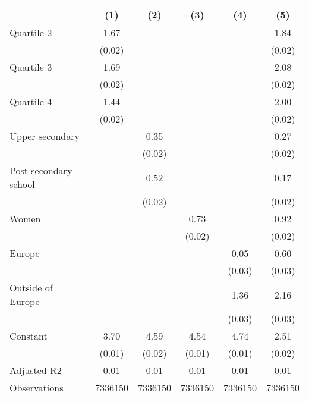 
\begin{tabular}{@{}l*{5}{S[table-format={-}2.2{\tnote{***}}]}@{}}
\toprule
{} & {(1)} & {(2)} & {(3)} & {(4)} & {(5)}\tabularnewline%
\midrule
Quartile 2 & 1.67\tnote{***} &  &  &  & 1.84\tnote{***}\tabularnewline%
 & (0.02) &  &  &  & \vphantom{2} (0.02)\tabularnewline%
Quartile 3 & 1.69\tnote{***} &  &  &  & 2.08\tnote{***}\tabularnewline%
 & (0.02) &  &  &  & \vphantom{1} (0.02)\tabularnewline%
Quartile 4 & 1.44\tnote{***} &  &  &  & 2.00\tnote{***}\tabularnewline%
 & (0.02) &  &  &  & (0.02)\tabularnewline%
Upper secondary &  & 0.35\tnote{***} &  &  & 0.27\tnote{***}\tabularnewline%
 &  & (0.02) &  &  & \vphantom{1} (0.02)\tabularnewline%
Post-secondary school &  & 0.52\tnote{***} &  &  & 0.17\tnote{***}\tabularnewline%
 &  & (0.02) &  &  & (0.02)\tabularnewline%
Women &  &  & 0.73\tnote{***} &  & 0.92\tnote{***}\tabularnewline%
 &  &  & (0.02) &  & (0.02)\tabularnewline%
Europe &  &  &  & 0.05\tnote{\dagger} & 0.60\tnote{***}\tabularnewline%
 &  &  &  & (0.03) & \vphantom{1} (0.03)\tabularnewline%
Outside of Europe &  &  &  & 1.36\tnote{***} & 2.16\tnote{***}\tabularnewline%
 &  &  &  & (0.03) & (0.03)\tabularnewline%
Constant & 3.70\tnote{***} & 4.59\tnote{***} & 4.54\tnote{***} & 4.74\tnote{***} & 2.51\tnote{***}\tabularnewline%
 & (0.01) & (0.02) & (0.01) & (0.01) & (0.02)\tabularnewline%
\midrule
Adjusted R2 & 0.01 & 0.01 & 0.01 & 0.01 & 0.01\tabularnewline%
Observations & {\num{7336150}} & {\num{7336150}} & {\num{7336150}} & {\num{7336150}} & {\num{7336150}}\tabularnewline%
\bottomrule
\end{tabular}

